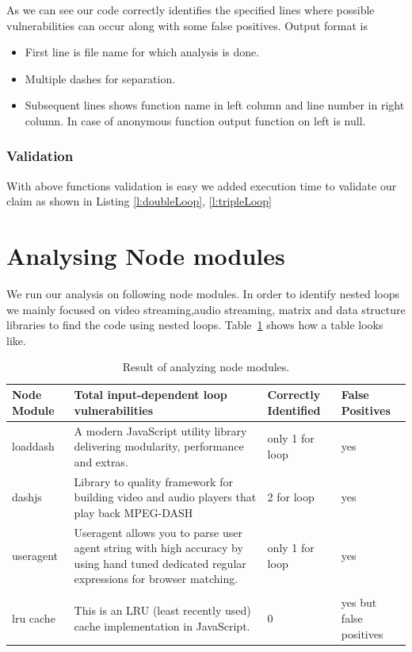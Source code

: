 \documentclass[authoryear,preprint]{sigplanconf}
\begin{document}
As we can see our code correctly identifies the specified lines where possible vulnerabilities can occur along with some false positives.
Output format is
\begin{itemize}
\item First line is file name for which analysis is done.
\item Multiple dashes for separation.
\item Subsequent lines shows function name in left column and line number in right column. In case of anonymous function output function on left is null.

\end{itemize}

\subsubsection{Validation}
With above functions validation is easy we added execution time to validate our claim as shown in Listing \ref{l:doubleLoop}, \ref{l:tripleLoop}

\section{Analysing Node modules}
We run our analysis on following node modules. In order to identify nested loops we mainly focused on video streaming,audio streaming, matrix and data structure libraries to find the code using nested loops.
Table~\ref{t:Comparison} shows how a table looks like.

\begin{table}[ht]
\begin{tabular}{ |p{2cm}||p{2cm}|p{2cm}|p{2cm}|  }
 \hline
 \textbf{Node Module}&\textbf{Total input-dependent loop vulnerabilities}&\textbf{Correctly Identified} &\textbf{False Positives}\\
 \hline
loaddash&A modern JavaScript utility library delivering modularity, performance and extras.&only 1 for loop &yes  \\
\hline 
dashjs &Library to quality framework for building video and audio players that play back MPEG-DASH&2 for loop &yes  \\
\hline 
useragent &Useragent allows you to parse user agent string with high accuracy by using hand tuned dedicated regular expressions for browser matching. &only 1 for loop &yes  \\
\hline \\
 lru cache & This is an LRU (least recently used) cache implementation in JavaScript.&0 &yes but false positives  \\
\hline 

\end{tabular}

\caption[Comparison]{\label{t:Comparison} Result of analyzing node modules.}
\end{table}
\end{document}
